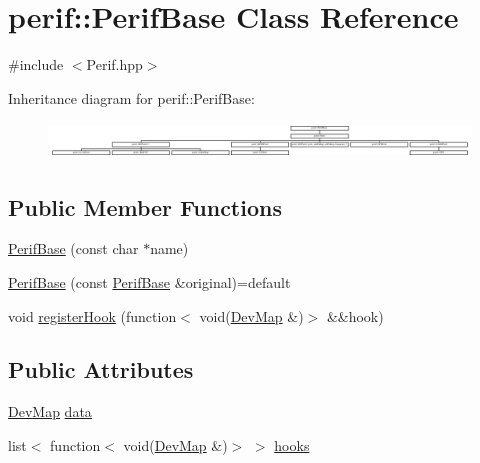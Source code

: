\hypertarget{classperif_1_1PerifBase}{}\section{perif\+::Perif\+Base Class Reference}
\label{classperif_1_1PerifBase}


{\ttfamily \#include $<$Perif.\+hpp$>$}

Inheritance diagram for perif\+::Perif\+Base\+:\begin{figure}[H]
\begin{center}
\leavevmode
\includegraphics[height=0.958084cm]{classperif_1_1PerifBase}
\end{center}
\end{figure}
\subsection*{Public Member Functions}
\begin{DoxyCompactItemize}
\item 
\mbox{\hyperlink{classperif_1_1PerifBase_a8ac4d4632fed61f15c375c6db4da3e77}{Perif\+Base}} (const char $\ast$name)
\item 
\mbox{\hyperlink{classperif_1_1PerifBase_a30553bdac90621e309a37628774a7a51}{Perif\+Base}} (const \mbox{\hyperlink{classperif_1_1PerifBase}{Perif\+Base}} \&original)=default
\item 
void \mbox{\hyperlink{classperif_1_1PerifBase_a2e8bcc221ee253b21b61c7c07307d931}{register\+Hook}} (function$<$ void(\mbox{\hyperlink{Perif_8hpp_a358ff4ee6d24694ee7661f0cce14377e}{Dev\+Map}} \&)$>$ \&\&hook)
\end{DoxyCompactItemize}
\subsection*{Public Attributes}
\begin{DoxyCompactItemize}
\item 
\mbox{\hyperlink{Perif_8hpp_a358ff4ee6d24694ee7661f0cce14377e}{Dev\+Map}} \mbox{\hyperlink{classperif_1_1PerifBase_a1a3afaa535fda17e9f97123fffe78765}{data}}
\item 
list$<$ function$<$ void(\mbox{\hyperlink{Perif_8hpp_a358ff4ee6d24694ee7661f0cce14377e}{Dev\+Map}} \&)$>$ $>$ \mbox{\hyperlink{classperif_1_1PerifBase_a98964e5ca8384df64881265e0aa6d7b6}{hooks}}
\end{DoxyCompactItemize}


